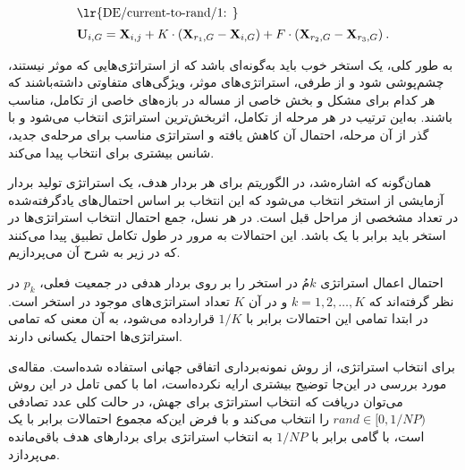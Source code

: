 \documentclass[12pt,a4paper]{article}
\theoremstyle{definition}
\theoremstyle{theorem}
\theoremstyle{definition}
\begin{document}
\begin{figure}[bh]
{\begin{minipage}[h][][b]{1.3\textwidth}
\begin{flushleft}
\begin{equation*}
\begin{aligned}
\shortintertext{\lr{DE/current-to-rand/1: }}
{\bf{U}}_{i,G} =
   {\bf{X}}_{i,j} + K \cdot ( {\bf{X}}_{r_1,G} - {\bf{X}}_{i,G}) + F \cdot ( {\bf{X}}_{r_2,G} - {\bf{X}}_{r_3,G}) \: .
\end{aligned} 
\end{equation*}

\end{flushleft}    
\hrulefill\par

\end{minipage}}
{\caption*{} } 
\end{figure}    


به طور کلی، یک استخر خوب باید به‌گونه‌ای باشد که از استراتژی‌هایی که موثر نیستند، چشم‌پوشی شود و از طرفی، استراتژی‌های موثر، ویژگی‌های متفاوتی داشته‌باشند که هر کدام برای مشکل و بخش خاصی از مساله در بازه‌های خاصی از تکامل، مناسب باشند. به‌این ترتیب در هر مرحله از تکامل، اثربخش‌ترین استراتژی انتخاب می‌شود و با گذر از آن مرحله، احتمال آن کاهش یافته و استراتژی‌ مناسب برای مرحله‌ی جدید، شانس بیشتری برای انتخاب پیدا می‌کند. 

همان‌گونه که اشاره‌شد، در الگوریتم 
برای هر بردار هدف، یک استراتژی تولید بردار آزمایشی از استخر انتخاب می‌شود که این انتخاب بر اساس احتمال‌های یادگرفته‌شده در تعداد مشخصی از مراحل قبل است. در هر نسل، جمع احتمال انتخاب استراتژی‌ها در استخر باید برابر با یک باشد. این احتمالات به مرور در طول تکامل تطبیق پیدا می‌کنند که در زیر به شرح آن می‌پردازیم. 

احتمال اعمال استراتژی
$\mathit{k}$مُ 
در استخر را بر روی بردار هدفی در جمعیت فعلی، 
$p_k$
در نظر گرفته‌اند که 
$k=1,2, \dots , K $ 
و در آن 
$K$
تعداد استراتژی‌های موجود در استخر است. در ابتدا تمامی این احتمالات برابر با 
$1/K$
قرارداده‌ می‌شود، به آن معنی که تمامی استراتژی‌ها احتمال یکسانی دارند. 

برای انتخاب استراتژی، از روش نمونه‌برداری اتفاقی جهانی \cite{selection} 
استفاده شده‌است. مقاله‌ی مورد بررسی در این‌جا توضیح بیشتری ارایه نکرده‌است، اما با کمی تامل در این روش می‌توان دریافت که انتخاب استراتژی برای جهش، در حالت کلی عدد تصادفی
$rand \in [ 0 , 1 / \mathit{NP}) $
را انتخاب می‌کند و با فرض این‌که مجموع احتمالات برابر با یک است،‌ با گامی برابر با 
$1 / \mathit{NP}$
به انتخاب استراتژی برای بردارهای هدف باقی‌مانده می‌پردازد. 
\end{document}
